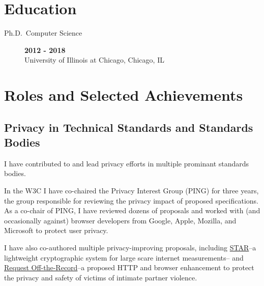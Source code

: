 \documentclass[wideaddress]{vitae}
\begin{document}
  \section{Education}
  \begin{description}
    \item[Ph.D.~Computer Science] \hfill \textbf{2012 - 2018}\\
    University of Illinois at Chicago, Chicago, IL
  \end{description}

  \section{Roles and Selected Achievements}

  \subsection{Privacy in Technical Standards and Standards Bodies}
  \begin{description}
    \item{\noindent I have contributed to and lead privacy efforts in multiple
    prominant standards bodies.}

    \item{\noindent In the W3C I have co-chaired the Privacy Interest
    Group (PING) for three years, the group responsible for reviewing the privacy
    impact of proposed specifications. As a co-chair of PING, I have reviewed
    dozens of proposals and worked with (and occasionally against) browser
    developers from Google, Apple, Mozilla, and Microsoft to protect
    user privacy.}

    \item{\noindent I have also co-authored multiple privacy-improving
    proposals, including \href{https://datatracker.ietf.org/doc/draft-dss-star/}{STAR}--a
    lightweight cryptographic system for large scare internet measurements--
    and \href{https://datatracker.ietf.org/doc/draft-sahib-httpbis-off-the-record/}{Request Off-the-Record}--a
    proposed HTTP and browser enhancement to protect the privacy and safety
    of victims of intimate partner violence.}
  \end{description}
\end{document}
